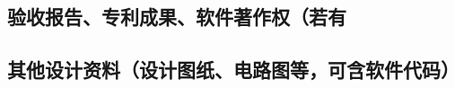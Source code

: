 		\subsection{验收报告、专利成果、软件著作权（若有} %
		\label{sub:验收报告_专利成果_软件著作权_若有}
		
		\newpage

		\subsection{其他设计资料（设计图纸、电路图等，可含软件代码）} %
		\label{sub:其他设计资料_设计图纸_电路图等_可含软件代码_}
		
